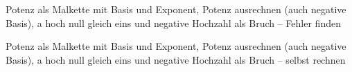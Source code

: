 \begin{aufgabe}{Potenz als Malkette mit Basis und Exponent, Potenz ausrechnen (auch negative Basis), a hoch null gleich eins und negative Hochzahl als Bruch – Fehler finden}
\end{aufgabe}

\begin{aufgabe}{Potenz als Malkette mit Basis und Exponent, Potenz ausrechnen (auch negative Basis), a hoch null gleich eins und negative Hochzahl als Bruch – selbst rechnen}
\end{aufgabe}
